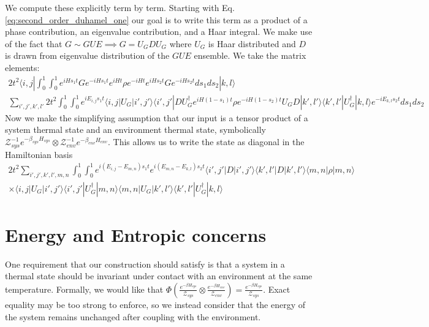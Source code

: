 \documentclass{article}
\newcommand{\ket}[1]{|#1\rangle}
\newcommand{\bra}[1]{\langle #1|}
\newcommand{\parens}[1]{\left( #1 \right)}
\newcommand{\partfun}{\mathcal{Z}}
\begin{document}
We compute these explicitly term by term. Starting with Eq. \eqref{eq:second_order_duhamel_one} our goal is to write this term as a product of a phase contribution, an eigenvalue contribution, and a Haar integral. We make use of the fact that $G \sim GUE \implies G = U_G D U_G$ where $U_G$ is Haar distributed and $D$ is drawn from eigenvalue distribution of the $GUE$ ensemble. We take the matrix elements:
\begin{align}
    2 t^2 \bra{i,j} \int_{0}^1 \int_0^1 e^{i H s_1 t} G e^{-iH s_1 t} e^{i H t} \rho e^{-i H t} e^{i H s_2 t} G e^{-iH s_2 t} ds_1 ds_2 \ket{k,l} \\
    \sum_{i',j',k',l'} 2t^2 \int_0^1 \int_0^1 e^{i E_{i,j} s_1 t} \bra{i,j} U_G \ket{i',j'} \bra{i',j'} D U_G^\dagger e^{i H (1-s_1) t} \rho e^{-i H (1-s_2) t} U_G D \ket{k',l'} \bra{k',l'} U_G^\dagger \ket{k,l} e^{-i E_{k,l} s_2 t} ds_1 ds_2 
\end{align}
Now we make the simplifying assumption that our input is a tensor product of a system thermal state and an environment thermal state, symbolically $\partfun_{sys}^{-1} e^{-\beta_{sys} H_{sys}} \otimes \partfun_{env}^{-1} e^{-\beta_{env}H_{env}}$. This allows us to write the state as diagonal in the Hamiltonian basis
\begin{align}
   2 t^2 \sum_{i',j',k',l', m,n} \int_0^1 \int_0^1 e^{i (E_{i,j} - E_{m,n}) s_1 t}  e^{i (E_{m,n} - E_{k,l})s_2 t} \bra{i',j'} D \ket{i',j'} \bra{k',l'} D \ket{k', l'} \bra{m,n} \rho \ket{m,n} \\
   \times \bra{i,j} U_G \ket{i',j'} \bra{i',j'} U_G^\dagger \ket{m,n} \bra{m,n} U_G \ket{k',l'} \bra{k',l'} U_G^\dagger \ket{k,l}
\end{align}

\section{Energy and Entropic concerns}
One requirement that our construction should satisfy is that a system in a thermal state should be invariant under contact with an environment at the same temperature. Formally, we would like that $\Phi \parens{\frac{e^{-\beta H_{sys}}}{\partfun_{sys}} \otimes \frac{e^{- \beta H_{env}}}{\partfun_{env}}} = \frac{e^{-\beta H_{sys}}}{\partfun_{sys}}$. Exact equality may be too strong to enforce, so we instead consider that the energy of the system remains unchanged after coupling with the environment. 
\end{document}
